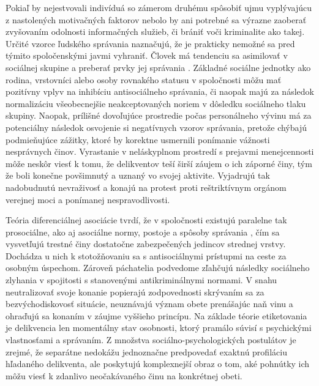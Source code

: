 \documentclass[12pt, a4paper]{article}
\begin{document}
Pokiaľ by nejestvovali indivíduá so zámerom druhému spôsobiť ujmu vyplývajúcu z nastolených motivačných
faktorov nebolo by ani potrebné sa výrazne zaoberať zvyšovaním odolnosti informačných služieb, či brániť
voči kriminalite ako takej. Určité vzorce ľudského správania naznačujú, že je prakticky nemožné sa pred 
týmito spoločenskými javmi vyhraniť. Človek má tendenciu sa asimilovať v sociálnej skupine a preberať prvky 
jej správania \cite{heretik}. Základné sociálne jednotky ako rodina, vrstovníci alebo osoby rovnakého
statusu v spoločnosti môžu mať pozitívny vplyv na inhibíciu antisociálneho správania, či naopak majú
za následok normalizáciu všeobecnejšie neakceptovaných noriem v dôsledku sociálneho tlaku skupiny.
Naopak, prílišné dovoľujúce prostredie počas personálneho vývinu má za potenciálny následok osvojenie si 
negatívnych vzorov správania, pretože chýbajú podmieňujúce zážitky, ktoré by korektne usmernili ponímanie 
vážnosti nesprávnych činov. Vyrastanie v neláskyplnom prostredí s prejavmi menejcennosti môže 
neskôr viesť k tomu, že delikventov teší širší záujem o ich záporné činy, tým že boli konečne povšimnutý a 
uznaný vo svojej aktivite. Vyjadrujú tak nadobudnutú nevraživosť a konajú na protest proti 
reštriktívnym orgánom verejnej moci a ponímanej nespravodlivosti.

Teória diferenciálnej asociácie tvrdí, že v spoločnosti existujú paralelne tak 
prosociálne, ako aj asociálne normy, postoje a spôsoby správania \cite{heretik}, čím sa vysvetľujú 
trestné činy dostatočne zabezpečených jedincov strednej vrstvy. Dochádza u nich k stotožňovaniu sa s 
antisociálnymi prístupmi na ceste za osobným úspechom. Zároveň páchatelia podvedome zľahčujú následky 
sociálneho zlyhania v spojitosti s stanovenými antikriminálnymi normami. V snahu neutralizovať svoje
konanie popierajú zodpovednosti skrývaním sa za bezvýchodiskovosť situácie, neuznávajú význam obete 
prenášajúc naň vinu a ohraďujú sa konaním v záujme vyššieho princípu. Na základe téorie etiketovania
je delikvencia len momentálny stav osobnosti, ktorý pramálo súvisí s psychickými vlastnosťami a správaním.
Z množstva sociálno-psychologických postulátov je zrejmé, že separátne nedokážu jednoznačne predpovedať 
exaktnú profiláciu hľadaného delikventa, ale poskytujú komplexnejší obraz o tom, aké pohnútky ich môžu viesť
k zdanlivo neočakávaného činu na konkrétnej obeti.
\end{document}
